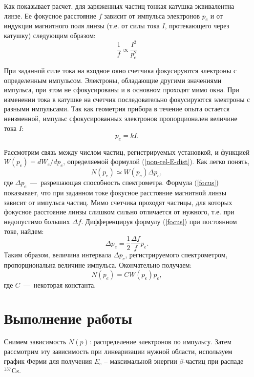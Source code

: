 \documentclass{lab}
\begin{document}
	Как показывает расчет, для заряженных частиц тонкая катушка эквивалентна линзе. Ее фокусное расстояние $f$ зависит от импульса электронов $p_e$ и от индукции магнитного поля линзы (т.е. от силы тока $I$, протекающего через катушку) следующим образом:
	\begin{equation} \label{focus}
	\frac{1}{f} \propto \frac{I^2}{p_e^2}
	\end{equation}
	
	При заданной силе тока на входное окно счетчика фокусируются электроны с определенным импульсом. Электроны, обладающие другими значениями импульса, при этом не сфокусированы и в основном проходят мимо окна. При изменении тока в катушке на счетчик последовательно фокусируются электроны с разными импульсами. Так как геометрия прибора в течение опыта остается неизменной, импульс сфокусированных электронов пропорционален величине тока $I$:
	\begin{equation}
	p_e = kI.
	\end{equation}
	
	Рассмотрим связь между числом частиц, регистрируемых установкой, и функцией $W(p_e) = dW_e/dp_e$, определяемой формулой (\ref{non-rel-E-dist}). Как легко понять, 
	\begin{equation}
	N(p_e) \simeq W(p_e) \Delta p_e,
	\end{equation}
	где $\Delta p_e$~---~разрешающая способность спектрометра. Формула (\ref{focus}) показывает, что при заданном токе фокусное расстояние магнитной линзы зависит от импульса частиц. Мимо счетчика проходят частицы, для которых фокусное расстояние линзы слишком сильно отличается от нужного, т.е. при недопустимо больших $\Delta f$. Дифференцируя формулу (\ref{focus}) при постоянном токе, найдем:
	\begin{equation}
	\Delta p_e = \frac{1}{2} \frac{\Delta f}{f} p_e.
	\end{equation}
	Таким образом, величина интервала $\Delta p_e$, регистрируемого спектрометром, пропорциональна величине импульса. Окончательно получаем:
	\begin{equation}
	N(p_e) = C W(p_e) p_e, 
	\end{equation}
	где $C$~---~некоторая константа.



\section*{Выполнение работы}

Снимем зависимость $ N(p) $: распределение электронов по импульсу. Затем рассмотрим эту зависимость при линеаризации нужной области, используем график Ферми для получения $ E_e $ -- максимальной энергии $ \beta $-частиц при распаде $ ^{137} $Cs.
\end{document}
